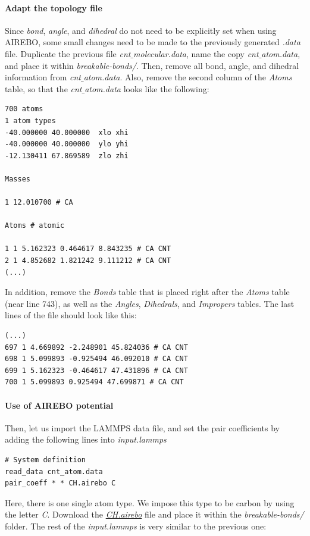 \documentclass[9pt,tutorial]{livecoms}
\begin{document}
\paragraph{Adapt the topology file}
Since \textit{bond}, \textit{angle}, and \textit{dihedral} do not need to be explicitly set when using AIREBO, some small changes need to be made to the previously generated \textit{.data} file. Duplicate the previous file \textit{cnt$\_$molecular.data}, name the copy \textit{cnt$\_$atom.data}, and place it within \textit{breakable-bonds/}. Then, remove all bond, angle, and dihedral information from \textit{cnt$\_$atom.data}. Also, remove the second column of the \textit{Atoms} table, so that the \textit{cnt$\_$atom.data} looks like the following: 
{\normalsize \begin{verbatim}
700 atoms
1 atom types
-40.000000 40.000000  xlo xhi
-40.000000 40.000000  ylo yhi
-12.130411 67.869589  zlo zhi

Masses

1 12.010700 # CA

Atoms # atomic

1 1 5.162323 0.464617 8.843235 # CA CNT
2 1 4.852682 1.821242 9.111212 # CA CNT
(...)
\end{verbatim}}
In addition, remove the \textit{Bonds} table that is placed right after the \textit{Atoms} table (near line 743), as well as the \textit{Angles}, \textit{Dihedrals}, and \textit{Impropers} tables. The last lines of the file should look like this:
{\normalsize \begin{verbatim}
(...)
697 1 4.669892 -2.248901 45.824036 # CA CNT
698 1 5.099893 -0.925494 46.092010 # CA CNT
699 1 5.162323 -0.464617 47.431896 # CA CNT
700 1 5.099893 0.925494 47.699871 # CA CNT
\end{verbatim}}

\paragraph{Use of AIREBO potential}
Then, let us import the LAMMPS data file, and set the pair coefficients by adding the following lines into \textit{input.lammps}
{\normalsize \begin{verbatim}
# System definition
read_data cnt_atom.data
pair_coeff * * CH.airebo C
\end{verbatim}}
Here, there is one single atom type. We impose this type to be carbon by using the letter \textit{C}. Download the \href{https://raw.githubusercontent.com/lammpstutorials/lammpstutorials-article/main/files/tutorial2/CH.airebo}{\textit{CH.airebo}} file and place it within the \textit{breakable-bonds/} folder. The rest of the \textit{input.lammps} is very similar to the previous one:
\end{document}
